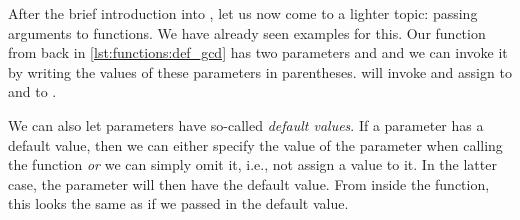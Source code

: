 %
\endhsection%
%
%
%
%
%
%
%
After the brief introduction into , let us now come to a lighter topic: passing arguments to functions.%
We have already seen examples for this.
Our  function from back in \cref{lst:functions:def_gcd} has two parameters  and  and we can invoke it by writing the values of these parameters in parentheses.
 will invoke  and assign  to  and  to .

We can also let parameters have so-called \emph{default values}.
If a parameter has a default value, then we can either specify the value of the parameter when calling the function \emph{or} we can simply omit it, i.e., not assign a value to it.
In the latter case, the parameter will then have the default value.
From inside the function, this looks the same as if we passed in the default value.

